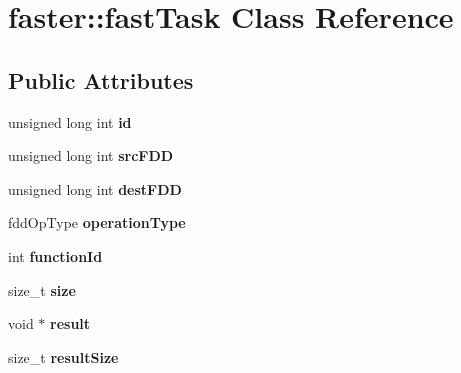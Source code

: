 \hypertarget{classfaster_1_1fastTask}{}\section{faster\+:\+:fast\+Task Class Reference}
\label{classfaster_1_1fastTask}
\subsection*{Public Attributes}
\begin{DoxyCompactItemize}
\item 
\hypertarget{classfaster_1_1fastTask_a0893bafe3573403565cd646887a75f0c}{}unsigned long int {\bfseries id}\label{classfaster_1_1fastTask_a0893bafe3573403565cd646887a75f0c}

\item 
\hypertarget{classfaster_1_1fastTask_a667e6dcb5f2088feaaec6be6c1dd7c64}{}unsigned long int {\bfseries src\+F\+D\+D}\label{classfaster_1_1fastTask_a667e6dcb5f2088feaaec6be6c1dd7c64}

\item 
\hypertarget{classfaster_1_1fastTask_ac4f233cc30ee2cc62cdffd6cb07fdb62}{}unsigned long int {\bfseries dest\+F\+D\+D}\label{classfaster_1_1fastTask_ac4f233cc30ee2cc62cdffd6cb07fdb62}

\item 
\hypertarget{classfaster_1_1fastTask_a8a1ca149031975f2200067efdf13c18f}{}fdd\+Op\+Type {\bfseries operation\+Type}\label{classfaster_1_1fastTask_a8a1ca149031975f2200067efdf13c18f}

\item 
\hypertarget{classfaster_1_1fastTask_a2803df27d5825ff2420ff53f833f0e0d}{}int {\bfseries function\+Id}\label{classfaster_1_1fastTask_a2803df27d5825ff2420ff53f833f0e0d}

\item 
\hypertarget{classfaster_1_1fastTask_abb6680128fc1658c092d3ca57cf1fedc}{}size\+\_\+t {\bfseries size}\label{classfaster_1_1fastTask_abb6680128fc1658c092d3ca57cf1fedc}

\item 
\hypertarget{classfaster_1_1fastTask_a4bfc59e6752f4a26c990a701c36bae5d}{}void $\ast$ {\bfseries result}\label{classfaster_1_1fastTask_a4bfc59e6752f4a26c990a701c36bae5d}

\item 
\hypertarget{classfaster_1_1fastTask_a01e745141b563ad20722a431390b5df6}{}size\+\_\+t {\bfseries result\+Size}\label{classfaster_1_1fastTask_a01e745141b563ad20722a431390b5df6}


\end{DoxyCompactItemize}
